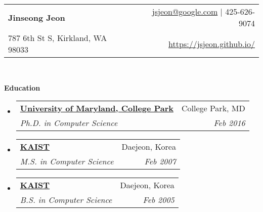 \documentclass[letterpaper,11pt]{article}
\makeatletter
\newcommand{\resheading}[1]{{\large \colorbox{mygrey}{\begin{minipage}{\textwidth}{\textbf{#1 \vphantom{p\^{E}}}}\end{minipage}}}}
\newcommand{\ressubheading}[4]{
\begin{tabular*}{6.5in}{l@{\extracolsep{\fill}}r}
    \textbf{#1} & #2 \\
    \textit{#3} & \textit{#4} \\
\end{tabular*}\vspace{-6pt}}
\makeatother
\begin{document}
\newcommand{\mywebheader}{
\begin{tabular*}{7in}{l@{\extracolsep{\fill}}r}
  \textbf{{\LARGE Jinseong Jeon}}
& \href{mailto:jsjeon@google.com}{jsjeon@google.com} \hspace{1mm}$\vert$\hspace{1mm} 425-626-9074
\\
  {\small 787 6th St S, Kirkland, WA 98033}
& \href{https://jsjeon.github.io/}{\url{https://jsjeon.github.io/}}
\\
\end{tabular*}
\\
\vspace{0.1in}}

\mywebheader

\resheading{Education}
  \begin{itemize}
    \item
      \ressubheading{\href{https://www.cs.umd.edu}{University of Maryland, College Park}}{College Park, MD}{{Ph.D. in Computer Science}}{Feb 2016}
    \item
      \ressubheading{\href{https://cs.kaist.ac.kr}{KAIST}}{Daejeon, Korea}{{M.S. in Computer Science}}{Feb 2007}
\begin{comment}
Outstanding Master's Thesis Award from Dept. of Computer Science, KAIST
\end{comment}
    \item
      \ressubheading{\href{https://cs.kaist.ac.kr}{KAIST}}{Daejeon, Korea}{{B.S. in Computer Science}}{Feb 2005}
\begin{comment}
Graduated with High Honor (\emph{Magna Cum Laude})
\end{comment}
  \end{itemize} %
\end{document}
